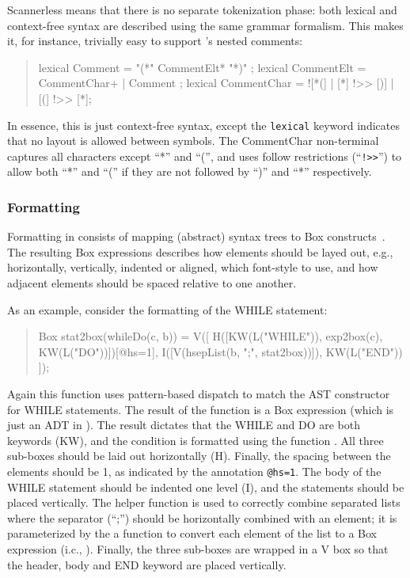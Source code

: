 Scannerless means that there is no separate tokenization phase: both
lexical and context-free syntax are described using the same grammar
formalism. This makes it, for instance, trivially easy to support
\oberon's nested comments:
\begin{quote}
\begin{rascal}
lexical Comment = "(*" CommentElt* "*)" ;
lexical CommentElt = CommentChar+ | Comment ;
lexical CommentChar = ![*(] | [*] !>> [)] | [(] !>> [*];
\end{rascal}
\end{quote}
In essence, this is just context-free syntax, except the
\texttt{lexical} keyword indicates that no layout is allowed between
symbols. The CommentChar non-terminal captures all characters except
``*'' and ``('', and uses follow restrictions (``\texttt{!>>}'') to
allow both ``*'' and ``('' if they are not followed by ``)'' and ``*''
respectively.

\subsubsection{Formatting}

\noindent Formatting in \Rascal consists of mapping (abstract) syntax
trees to Box constructs~\cite{Box}. The resulting Box expressions
describes how elements should be layed out, e.g., horizontally,
vertically, indented or aligned, which font-style to use, and how
adjacent elements should be spaced relative to one another.

As an example, consider the formatting of the WHILE statement:
\begin{quote}
\begin{rascal}
Box stat2box(whileDo(c, b)) = V([
   H([KW(L("WHILE")), exp2box(c), KW(L("DO"))])[@hs=1],
      I([V(hsepList(b, ";", stat2box))]),
   KW(L("END"))
]);  
\end{rascal} 
\end{quote}
Again this function uses pattern-based dispatch to match the AST
constructor for WHILE statements. The result of the function is a Box
expression (which is just an ADT in \Rascal). The result dictates that
the WHILE and DO are both keywords (KW), and the condition 
is formatted using the function . All three sub-boxes
should be laid out horizontally (H). Finally, the spacing between the
elements should be 1, as indicated by the annotation \texttt{@hs=1}.
The body  of the WHILE statement should be indented one
level (I), and the statements should be placed vertically. The helper
function  is used to correctly combine separated
lists where the separator (``;'') should be horizontally combined with
an element; it is parameterized by the a function to convert each
element of the list to a Box expression (i.c., ).
Finally, the three sub-boxes are wrapped in a V box so that the
header, body and END keyword are placed vertically.


